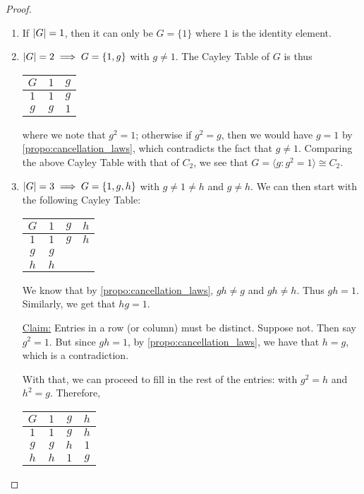 \begin{proof}
  \begin{enumerate}
    \item If $\left|G\right| = 1$, then it can only be $G = \{1\}$ where $1$ is the identity element.
    \item $\left|G\right| = 2 \implies G = \{1, g\}$ with $g \neq 1$. The Cayley Table of $G$ is thus
      \begin{center}
        \begin{tabular}{c | c c}
        $G$ & $1$ & $g$ \\
        \hline
        $1$ & $1$ & $g$ \\
        $g$ & $g$ & $1$
        \end{tabular}
      \end{center}
      where we note that $g^2 = 1$; otherwise if $g^2 = g$, then we would have $g = 1$ by \autoref{propo:cancellation_laws}, which contradicts the fact that $g \neq 1$. Comparing the above Cayley Table with that of $C_2$, we see that $G = \langle g : g^2 = 1 \rangle \cong C_2$.
    \item $\left|G\right| = 3 \implies G = \{1, g, h\}$ with $g \neq 1 \neq h$ and $g \neq h$. We can then start with the following Cayley Table:
      \begin{center}
        \begin{tabular}{c | c c c}
        $G$ & $1$ & $g$ & $h$ \\
        \hline
        $1$ & $1$ & $g$ & $h$ \\
        $g$ & $g$ &     &     \\
        $h$ & $h$ &     &     
        \end{tabular}
      \end{center}
      We know that by \autoref{propo:cancellation_laws}, $gh \neq g$ and $gh \neq h$. Thus $gh = 1$. Similarly, we get that $hg = 1$.

      \underline{Claim:} Entries in a row (or column) must be distinct. Suppose not. Then say $g^2 = 1$. But since $gh = 1$, by \autoref{propo:cancellation_laws}, we have that $h = g$, which is a contradiction.

      With that, we can proceed to fill in the rest of the entries: with $g^2 = h$ and $h^2 = g$. Therefore,
      \begin{center}
        \begin{tabular}{c | c c c}
        $G$ & $1$ & $g$ & $h$ \\
        \hline
        $1$ & $1$ & $g$ & $h$ \\
        $g$ & $g$ & $h$ & $1$ \\
        $h$ & $h$ & $1$ & $g$
        \end{tabular}
      \end{center}


\end{enumerate}
\end{proof}
